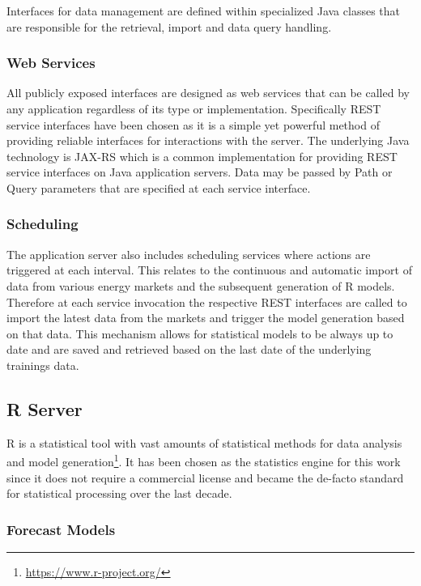 Interfaces for data management are defined within specialized Java classes that are responsible for the retrieval, import and data query handling. 

\subsubsection{Web Services}

All publicly exposed interfaces are designed as web services that can be called by any application regardless of its type or implementation. Specifically REST service interfaces have been chosen as it is a simple yet powerful method of providing reliable interfaces for interactions with the server. The underlying Java technology is JAX-RS which is a common implementation for providing REST service interfaces on Java application servers. Data may be passed by Path or Query parameters that are specified at each service interface. 

\subsubsection{Scheduling}

The application server also includes scheduling services where actions are triggered at each interval. This relates to the continuous and automatic import of data from various energy markets and the subsequent generation of R models. Therefore at each service invocation the respective REST interfaces are called to import the latest data from the markets and trigger the model generation based on that data. This mechanism allows for statistical models to be always up to date and are saved and retrieved based on the last date of the underlying trainings data. 



\subsection{R Server}

R is a statistical tool with vast amounts of statistical methods for data analysis and model generation\footnote{\url{https://www.r-project.org/}}. It has been chosen as the statistics engine for this work since it does not require a commercial license and became the de-facto standard for statistical processing over the last decade. 

\subsubsection{Forecast Models}

